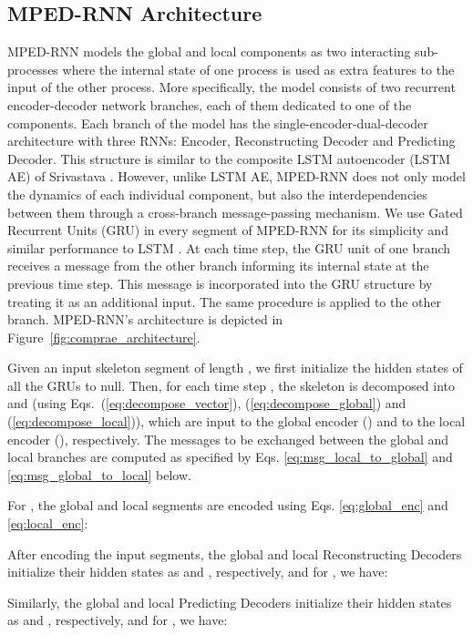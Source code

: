 \subsection{MPED-RNN Architecture}

MPED-RNN models the global and local components as two interacting
sub-processes where the internal state of one process is used as extra
features to the input of the other process. More specifically, the
model consists of two recurrent encoder-decoder network branches,
each of them dedicated to one of the components. Each branch of the
model has the single-encoder-dual-decoder architecture with three
RNNs: Encoder, Reconstructing Decoder and Predicting Decoder. This
structure is similar to the composite LSTM autoencoder (LSTM AE) of
Srivastava \etal \cite{srivastava2015unsupervised}. However, unlike
LSTM AE, MPED-RNN does not only model the dynamics of each individual
component, but also the interdependencies between them through a cross-branch
message-passing mechanism. We use Gated Recurrent Units (GRU) \cite{cho2014learning}
in every segment of MPED-RNN for its simplicity and similar performance
to LSTM \cite{greff2017lstm}. At each time step, the GRU unit of
one branch receives a message from the other branch informing its
internal state at the previous time step. This message is incorporated
into the GRU structure by treating it as an additional input. The
same procedure is applied to the other branch. MPED-RNN's architecture
is depicted in Figure~\ref{fig:comprae_architecture}.

Given an input skeleton segment of length , we first initialize
the hidden states of all the GRUs to null. Then, for each time step
, the skeleton  is decomposed into  and 
(using Eqs.~(\ref{eq:decompose_vector}), (\ref{eq:decompose_global})
and (\ref{eq:decompose_local})), which are input to the global encoder
() and to the local encoder (), respectively. The
messages to be exchanged between the global and local branches are
computed as specified by Eqs. \ref{eq:msg_local_to_global} and \ref{eq:msg_global_to_local}
below.


For , the global and local segments are encoded using
Eqs. \ref{eq:global_enc} and \ref{eq:local_enc}: 


After encoding the input segments, the global and local Reconstructing
Decoders initialize their hidden states as 
and , respectively, and for ,
we have:


Similarly, the global and local Predicting Decoders initialize their
hidden states as  and ,
respectively, and for , we have:


